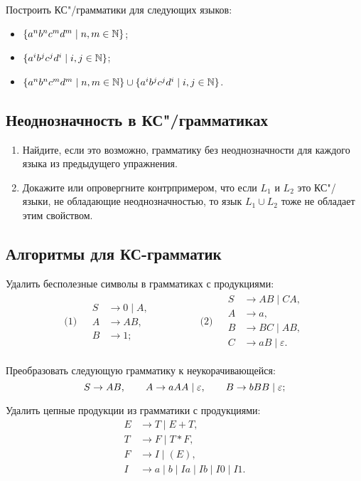 Построить КС"/грамматики для следующих языков:
\begin{itemize}
    \item $\{ a^n b^n c^m d^m \mid n, m \in \mathbb N \}$;
    \item $\{a^i b^j c^j d^i \mid i, j \in \mathbb N\}$;
    \item $\{ a^n b^n c^m d^m \mid n, m \in \mathbb N \} \cup \{a^i b^j c^j d^i \mid i, j \in \mathbb N\}$.
\end{itemize}


\subsection*{Неоднозначность в КС"/грамматиках}

\begin{enumerate}
    \item Найдите, если это возможно, грамматику без
    неоднозначности для каждого языка из предыдущего упражнения.

    \item Докажите или опровергните контрпримером, что если
     $L_1$ и $L_2$ это КС"/языки,
    не обладающие неоднозначностью, то язык $L_1 \cup L_2$
    тоже не обладает этим свойством.
\end{enumerate}


\subsection*{Алгоритмы для КС-грамматик}

Удалить бесполезные символы в грамматиках с продукциями:
\begin{align*}
    \text{(1) }&
        \begin{aligned}%
            S &\to 0 \mid A,\\
            A &\to AB,\\
            B &\to 1;
        \end{aligned}
        \qquad\qquad
    &
    \text{(2) }&
        \begin{aligned}%
            S &\to AB \mid CA,\\
            A &\to a,\\
            B &\to BC \mid AB,\\
            C &\to aB \mid \varepsilon.
        \end{aligned}
\end{align*}

Преобразовать следующую грамматику к неукорачивающейся:
\[
            S \to  AB,\qquad
            A \to aAA \mid \varepsilon,\qquad
            B \to bBB \mid \varepsilon;
\]

Удалить цепные продукции из грамматики с продукциями:
\begin{align*}
            E &\to T \mid E+T,\\
            T &\to F \mid T*F,\\
            F &\to I \mid (E),\\
            I &\to a \mid b \mid Ia \mid Ib \mid I0 \mid I1.\\
\end{align*}
